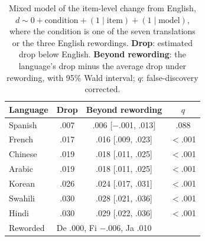 \begin{table}[t]
\centering
\small
\setlength{\tabcolsep}{4pt}
\begin{tabular}{lccc}
\toprule
\textbf{Language} & \textbf{Drop} & \textbf{Beyond rewording} & $q$ \\
\midrule
Spanish & .007 & .006 [$-$.001, .013] & .088 \\
French & .017 & .016 [.009, .023] & $<$.001 \\
Chinese & .019 & .018 [.011, .025] & $<$.001 \\
Arabic & .019 & .018 [.011, .025] & $<$.001 \\
Korean & .026 & .024 [.017, .031] & $<$.001 \\
Swahili & .030 & .028 [.021, .036] & $<$.001 \\
Hindi & .030 & .029 [.022, .036] & $<$.001 \\
\midrule
Reworded & \multicolumn{3}{l}{De .000, Fi $-$.006, Ja .010} \\
\bottomrule
\end{tabular}
\caption{Mixed model of the item-level change from English, $d \sim 0 + \text{condition} + (1 \mid \text{item}) + (1 \mid \text{model})$, where the condition is one of the seven translations or the three English rewordings. \textbf{Drop}: estimated drop below English. \textbf{Beyond rewording}: the language's drop minus the average drop under rewording, with 95\% Wald interval; $q$: false-discovery corrected.}
\label{tab:mixed_crossed}
\end{table}
